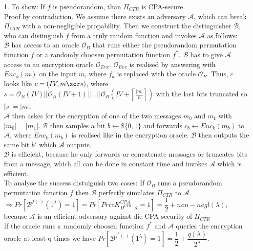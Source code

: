 1. To show: If \(f\) is pseudorandom, than \(\Pi_{CTR}\) is CPA-secure. \\
Proof by contradiction. We assume there exists an adversary \(\mathcal{A}\), which can break \(\Pi_{CTR}\) with a non-negligible propability. Then we construct the distinguisher \(\mathcal{B}\), who can distinguish \(f\) from a truly random function and invokes \(\mathcal{A}\) as follows: \\
\(\mathcal{B}\) has access to an oracle \(\mathcal{O}_{B}\) that runs either the pseudorandom permutation function \(f\) or a randomly choosen permutation function \(f^*\).
\(\mathcal{B}\) has to give \(\mathcal{A}\) access to an encryption oracle \(\mathcal{O}_{Enc}\). \(\mathcal{O}_{Enc}\) is realised by answering with \(Enc_k(m)\) on the input \(m\), where \(f_k\) is replaced with the oracle \(\mathcal{O}_{B}\). Thus, \(c\) looks like \(c = (IV, m \xor s)\), where \(s = \mathcal{O}_{B}(IV) \vert\vert \mathcal{O}_{B}(IV + 1) \vert\vert ... \vert\vert \mathcal{O}_{B}\left(IV + \left\lceil \frac{\vert m \vert}{n}\right \rceil \right) \) 
with the last bits truncated so \(\vert s \vert = \vert m \vert\).\\
\(\mathcal{A}\) then askes for the encryption of one of the two messages \(m_0\) and \(m_1\) with \(\vert m_0 \vert = \vert m_1 \vert \). \(\mathcal{B}\) then samples a bit \(b \leftarrow\$ \{0,1\}\) and forwards \(c_b \leftarrow Enc_k(m_b)\) to \(\mathcal{A}\), where \(Enc_k(m_b)\) is realised like in the encryption oracle. \(\mathcal{B}\) then outputs the same bit \(b'\) which \(\mathcal{A}\) outputs. \\
\(\mathcal{B}\) is efficient, because he only forwards or concatenate messages or truncates bits from a message, which all can be done in constant time and invokes \(\mathcal{A}\) which is efficient.\\
To analyse the success distuiguish two cases: If \(\mathcal{O}_{B}\) runs a pseudorandom permutation function \(f\) then \(\mathcal{B}\) perfectly simulates \(\Pi_{CTR}\) to \(\mathcal{A}\). \(\Rightarrow Pr[\mathcal{B}^{f(\cdot)}(1^\lambda) = 1] = Pr[PrivK^{CPA}_{\Pi^{CTR},\mathcal{A}} = 1] = \dfrac{1}{2} + non-negl(\lambda)\), because \(\mathcal{A}\) is an efficient adversary against die CPA-security of \(\Pi_{CTR}\)\\
If the oracle runs a randomly choosen function \(f^*\) and \(\mathcal{A}\) queries the encryption oracle at least q times we have \(Pr[\mathcal{B}^{f^*(\cdot)}(1^\lambda) = 1] = \dfrac{1}{2} + \dfrac{q(\lambda)}{2^\lambda}\).\\
